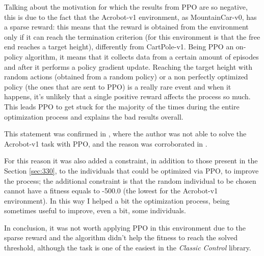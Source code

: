 Talking about the motivation for which the results from PPO are so negative, this is due to the fact that the Acrobot-v1 environment, as MountainCar-v0, has a sparse reward: this means that the reward is obtained from the environment only if it can reach the termination criterion (for this environment is that the free end reaches a target height), differently from CartPole-v1. Being PPO an on-policy algorithm, it means that it collects data from a certain amount of episodes and after it performs a policy gradient update. Reaching the target height with random actions (obtained from a random policy) or a non perfectly optimized policy (the ones that are sent to PPO) is a really rare event and when it happens, it's unlikely that a single positive reward affects the process so much. This leads PPO to get stuck for the majority of the times during the entire optimization process and explains the bad results overall.

This statement was confirmed in \cite{ppo_acrobot}, where the author was not able to solve the Acrobot-v1 task with PPO, and the reason was corroborated in \cite{ppo_mountaincar}.

For this reason it was also added a constraint, in addition to those present in the Section \ref{sec:330}, to the individuals that could be optimized via PPO, to improve the process; the additional constraint is that the random individual to be chosen cannot have a fitness equals to -500.0 (the lowest for the Acrobot-v1 environment). In this way I helped a bit the optimization process, being sometimes useful to improve, even a bit, some individuals.

In conclusion, it was not worth applying PPO in this environment due to the sparse reward and the algorithm didn't help the fitness to reach the solved threshold, although the task is one of the easiest in the \textit{Classic Control} library.
\vspace{0.3in}


